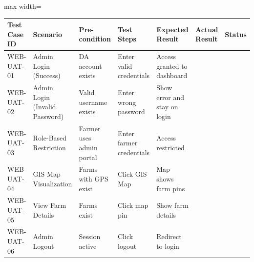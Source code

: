 {\begin{table}[H]
		\begin{adjustbox}{max width=\textwidth}
			\begin{tabular}{p{2cm}p{3cm}p{3cm}p{3cm}p{4cm}p{4cm}p{1.5cm}}
				\toprule
				\textbf{Test Case ID} & \textbf{Scenario} & \textbf{Pre-condition} & \textbf{Test Steps} & \textbf{Expected Result} & \textbf{Actual Result} & \textbf{Status} \\
				\midrule
				WEB-UAT-01 & Admin Login (Success) & DA account exists & Enter valid credentials & Access granted to dashboard & & \\
				WEB-UAT-02 & Admin Login (Invalid Password) & Valid username exists & Enter wrong password & Show error and stay on login & & \\
				WEB-UAT-03 & Role-Based Restriction & Farmer uses admin portal & Enter farmer credentials & Access restricted & & \\
				WEB-UAT-04 & GIS Map Visualization & Farms with GPS exist & Click GIS Map & Map shows farm pins & & \\
				WEB-UAT-05 & View Farm Details & Farms exist & Click map pin & Show farm details & & \\
				WEB-UAT-06 & Admin Logout & Session active & Click logout & Redirect to login & & \\
				\bottomrule
			\end{tabular}
		\end{adjustbox}
	\end{table}
	
	
	\begin{table}[H]
		\centering
		\renewcommand{\arraystretch}{1.2}
		\caption*{\textbf{F. Crop Recommendation}}
		

\end{table}}
